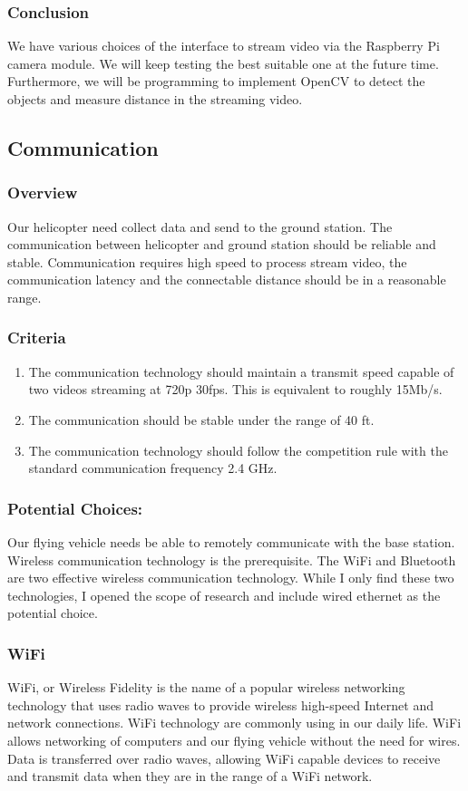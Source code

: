 \documentclass[onecolumn, draftclsnofoot,10pt, compsoc]{IEEEtran}
\begin{document}
\subsubsection{Conclusion}
We have various choices of the interface to stream video via the Raspberry Pi camera module. We will keep testing the best suitable one at the future time. Furthermore, we will be programming to implement OpenCV to detect the objects and measure distance in the streaming video.

\subsection{Communication}
\subsubsection{Overview}
Our helicopter need collect data and send to the ground station. The communication between helicopter and ground station should be reliable and stable. Communication requires high speed to process stream video, the communication latency and the connectable distance should be in a reasonable range.

\subsubsection{Criteria}
\begin{enumerate}
\item{The communication technology should maintain a transmit speed capable of two videos streaming at 720p 30fps. This is equivalent to roughly 15Mb/s.}
\item {The communication should be stable under the range of 40 ft.}
\item {The communication technology should follow the competition rule with the standard communication frequency 2.4 GHz.}
\end{enumerate}

\subsubsection{Potential Choices:}
Our flying vehicle needs be able to remotely communicate with the base station. Wireless communication technology is the prerequisite. The WiFi and Bluetooth are two effective wireless communication technology. While I only find these two technologies, I opened the scope of research and include wired ethernet as the potential choice.
\subsubsection{WiFi}
WiFi, or Wireless Fidelity\cite{r17} is the name of a popular wireless networking technology that uses radio waves to provide wireless high-speed Internet and network connections. WiFi technology are commonly using in our daily life. WiFi allows networking of computers and our flying vehicle without the need for wires. Data is transferred over radio waves, allowing WiFi capable devices to receive and transmit data when they are in the range of a WiFi network. 
\end{document}
